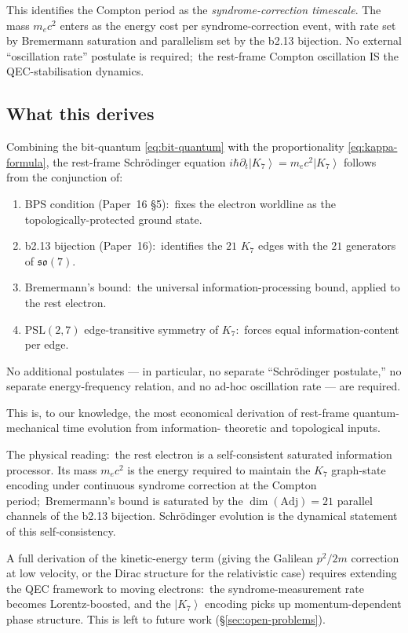 \documentclass[11pt]{article}
\newcommand{\so}{\mathfrak{so}}
\newcommand{\Adj}{\mathrm{Adj}}
\newcommand{\ket}[1]{\left|#1\right\rangle}
\newcommand{\PSL}{\mathrm{PSL}}
\begin{document}
This identifies the Compton period as the \emph{syndrome-correction
timescale}.  The mass $m_e c^2$ enters as the energy cost per
syndrome-correction event, with rate set by Bremermann saturation
and parallelism set by the b2.13 bijection.  No external
``oscillation rate'' postulate is required;\ the rest-frame Compton
oscillation IS the QEC-stabilisation dynamics.

\subsection{What this derives}
\label{sec:schrodinger-summary}

Combining the bit-quantum \eqref{eq:bit-quantum} with the
proportionality \eqref{eq:kappa-formula}, the rest-frame
Schr\"odinger equation $i\hbar \partial_t \ket{K_7} = m_e c^2
\ket{K_7}$ follows from the conjunction of:
\begin{enumerate}
\item BPS condition (Paper~16 \S5):\ fixes the electron worldline
  as the topologically-protected ground state.
\item b2.13 bijection (Paper~16):\ identifies the $21$ $K_7$ edges
  with the $21$ generators of $\so(7)$.
\item Bremermann's bound:\ the universal information-processing
  bound, applied to the rest electron.
\item $\PSL(2,7)$ edge-transitive symmetry of $K_7$:\ forces equal
  information-content per edge.
\end{enumerate}
No additional postulates --- in particular, no separate
``Schr\"odinger postulate,'' no separate energy-frequency relation,
and no ad-hoc oscillation rate --- are required.

This is, to our knowledge, the most economical derivation of
rest-frame quantum-mechanical time evolution from information-
theoretic and topological inputs.

The physical reading:\ the rest electron is a self-consistent
saturated information processor.  Its mass $m_e c^2$ is the energy
required to maintain the $K_7$ graph-state encoding under continuous
syndrome correction at the Compton period;\ Bremermann's bound is
saturated by the $\dim(\Adj) = 21$ parallel channels of the b2.13
bijection.  Schr\"odinger evolution is the dynamical statement of
this self-consistency.

A full derivation of the kinetic-energy term (giving the Galilean
$p^2/2m$ correction at low velocity, or the Dirac structure for the
relativistic case) requires extending the QEC framework to moving
electrons:\ the syndrome-measurement rate becomes Lorentz-boosted,
and the $\ket{K_7}$ encoding picks up momentum-dependent phase
structure.  This is left to future work
(\S\ref{sec:open-problems}).
\end{document}
